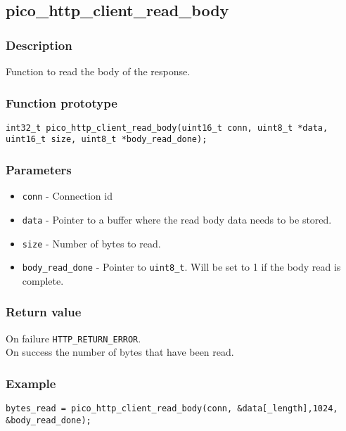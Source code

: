
\subsection{pico\_http\_client\_read\_body}

\subsubsection*{Description}
Function to read the body of the response.

\subsubsection*{Function prototype}
\texttt{int32\_t pico\_http\_client\_read\_body(uint16\_t conn, uint8\_t *data, uint16\_t size, uint8\_t *body\_read\_done);}

\subsubsection*{Parameters}
\begin{itemize}[noitemsep]
\item \texttt{conn} - Connection id
\item \texttt{data} - Pointer to a buffer where the read body data needs to be stored.
\item \texttt{size} - Number of bytes to read.
\item \texttt{body\_read\_done} - Pointer to \texttt{uint8\_t}. Will be set to 1 if the body read is complete.
\end{itemize}
\subsubsection*{Return value}
On failure \texttt{HTTP\_RETURN\_ERROR}.
\\On success the number of bytes that have been read.
\subsubsection*{Example}
\begin{verbatim}
bytes_read = pico_http_client_read_body(conn, &data[_length],1024, &body_read_done);
\end{verbatim}
